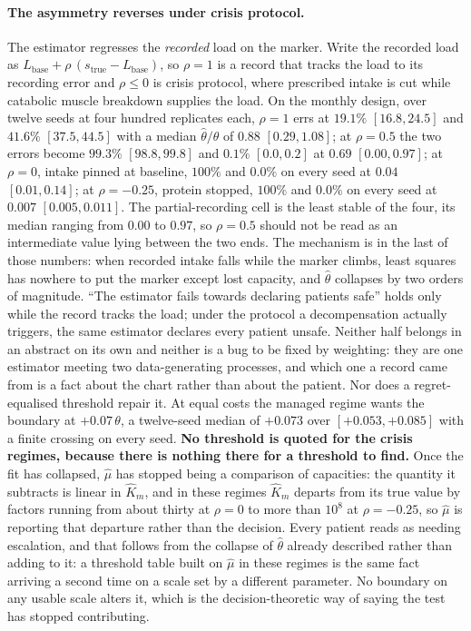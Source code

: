 \paragraph{The asymmetry reverses under crisis protocol.} The estimator regresses the
\emph{recorded} load on the marker. Write the recorded load as
$L_{\mathrm{base}} + \rho\,(s_{\mathrm{true}} - L_{\mathrm{base}})$, so $\rho = 1$ is a
record that tracks the load to its recording error and $\rho \le 0$ is crisis protocol,
where prescribed intake is cut while catabolic muscle breakdown supplies the load. On the
monthly design, over twelve seeds at four hundred replicates each, $\rho = 1$ errs at
$19.1\%$ $[16.8, 24.5]$ and $41.6\%$ $[37.5, 44.5]$ with a median $\hat\theta/\theta$ of
$0.88$ $[0.29, 1.08]$; at $\rho = 0.5$ the two errors become $99.3\%$ $[98.8, 99.8]$ and
$0.1\%$ $[0.0, 0.2]$ at $0.69$ $[0.00, 0.97]$; at $\rho = 0$, intake pinned at baseline,
$100\%$ and $0.0\%$ on every seed at $0.04$ $[0.01, 0.14]$; at $\rho = -0.25$, protein
stopped, $100\%$ and $0.0\%$ on every seed at $0.007$ $[0.005, 0.011]$. The
partial-recording cell is the least stable of the four, its median ranging from $0.00$ to
$0.97$, so $\rho = 0.5$ should not be read as an intermediate value lying between the two
ends. The mechanism is in the last of those
numbers: when recorded intake falls while the marker climbs, least squares has nowhere to
put the marker except lost capacity, and $\hat\theta$ collapses by two orders of
magnitude. ``The estimator fails towards declaring patients safe'' holds only while the
record tracks the load; under the protocol a decompensation actually triggers, the same
estimator declares every patient unsafe. Neither half belongs in an abstract on its own
and neither is a bug to be fixed by weighting: they are one estimator meeting two
data-generating processes, and which one a record came from is a fact about the chart
rather than about the patient. Nor does a regret-equalised threshold repair it. At equal
costs the managed regime wants the boundary at $+0.07\,\theta$, a twelve-seed median of
$+0.073$ over $[+0.053, +0.085]$ with a finite crossing on every seed. \textbf{No
threshold is quoted for the crisis regimes, because there is nothing there for a threshold
to find.} Once the fit has collapsed, $\hat\mu$ has stopped being a comparison of
capacities: the quantity it subtracts is linear in $\hat K_m$, and in these regimes
$\hat K_m$ departs from its true value by factors running from about thirty at
$\rho = 0$ to more than $10^{8}$ at $\rho = -0.25$, so $\hat\mu$ is reporting that
departure rather than the decision. Every patient reads as needing escalation, and that
follows from the collapse of $\hat\theta$ already described rather than adding to it: a
threshold table built on $\hat\mu$ in these regimes is the same fact arriving a second
time on a scale set by a different parameter. No boundary on any usable scale alters it,
which is the decision-theoretic way of saying the test has stopped contributing.


